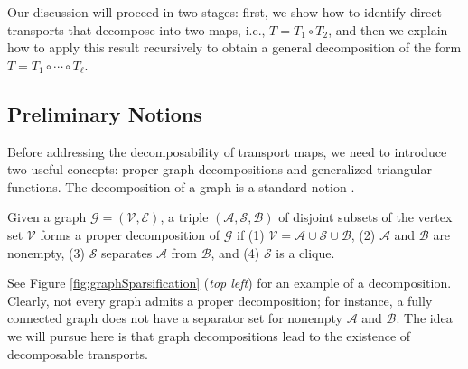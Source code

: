 \documentclass[twoside,11pt]{article}
\newcommand{\Bc}{\mathcal{B}}
\newcommand{\Vc}{\mathcal{V}}
\newcommand{\Ec}{\mathcal{E}}
\newcommand{\Ac}{\mathcal{A}}
\newcommand{\Sc}{\mathcal{S}}
\newcommand{\Gcb}{\boldsymbol{\mathcal{G}}}
\newcommand{\Aset}{ \Ac }
\newcommand{\Bset}{ \Bc }
\newcommand{\Sset}{ \Sc }
\begin{document}
Our discussion will proceed in two stages: first, we show how to
identify direct transports that decompose into two maps, i.e.,
$T=T_1\circ T_2$, and then we explain how to apply this result
recursively to obtain a general decomposition of the form
$T=T_1\circ \cdots \circ T_\ell$.

\subsection{Preliminary Notions}
\label{sec:prelnotions}
Before addressing the decomposability of transport maps, we need to
introduce two useful concepts: proper graph decompositions and generalized
triangular functions. The decomposition of a graph is a standard
notion \citep{lauritzen1996graphical}.
%
%
\begin{definition} \label{def:graphDec}
Given a graph $\Gcb=(\Vc,\Ec)$, a triple 
$(\Aset,\Sset,\Bset)$ of disjoint  subsets of the vertex set $\Vc$ forms a 
proper decomposition of $\Gcb$ if (1)  $\Vc = \Aset \cup \Sset \cup \Bset$, 
(2) $\Aset$ and $\Bset$ are nonempty,
(3) $\Sset$ separates $\Aset$ from $\Bset$, and (4) $\Sset$ is a clique. %
%
%
%
%
%
%
\end{definition}
%
%
%
%
%
%
%
%
%
%
%
%
%
%
See Figure
\ref{fig:graphSparsification} (\textit{top left}) for an example of
a decomposition.
Clearly, not every graph admits a proper decomposition; for
instance, a fully connected graph does not have a separator set for %
nonempty $\Aset$ and $\Bset$.  The idea we will
pursue here is that 
graph decompositions
%
lead to the existence of
decomposable transports.
%
%
%
%
%
%
%
\end{document}
